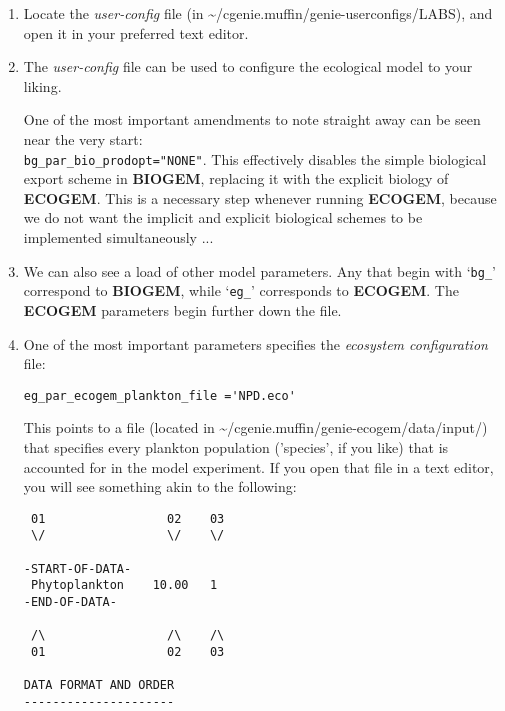 \documentclass[11pt,fleqn]{book} %
\begin{document}
\begin{enumerate}[noitemsep]
\vspace{1mm}
\item Locate the \textit{user-config} file (in \textsf{\footnotesize \textasciitilde{}/cgenie.muffin/genie-userconfigs/LABS}), and open it in your preferred text editor.
\vspace{1mm}
\item The \textit{user-config} file can be used to configure the ecological model to your liking. 

One of the most important amendments to note straight away can be seen near the very start:
\\\texttt{bg\_par\_bio\_prodopt="NONE"}. This effectively disables the simple biological export scheme in \textbf{BIOGEM}, replacing it with the explicit biology of \textbf{ECOGEM}. This is a necessary step whenever running \textbf{ECOGEM}, because we do not want the implicit and explicit biological schemes to be implemented simultaneously ...
\vspace{1mm}
\item We can also see a load of other model parameters. Any that begin with `\texttt{bg\_}' correspond to \textbf{BIOGEM}, while `\texttt{eg\_}' corresponds to \textbf{ECOGEM}. The \textbf{ECOGEM} parameters begin further down the file.
\vspace{1mm}
\item One of the most important parameters specifies the \textit{ecosystem configuration} file:
\vspace{-1mm}
\small\begin{verbatim}
eg_par_ecogem_plankton_file ='NPD.eco'
\end{verbatim}\normalsize
\vspace{-0mm}
This points to a file (located in \textsf{\footnotesize \textasciitilde{}/cgenie.muffin/genie-ecogem/data/input/}) that specifies every plankton population ('species', if you like) that is accounted for in the model experiment. If you open that file in a text editor, you will see something akin to the following:
\scriptsize\begin{verbatim}
 01                 02    03
 \/                 \/    \/

-START-OF-DATA-
 Phytoplankton    10.00   1
-END-OF-DATA-

 /\                 /\    /\
 01                 02    03

DATA FORMAT AND ORDER
---------------------


\end{verbatim}
\end{enumerate}
\end{document}

